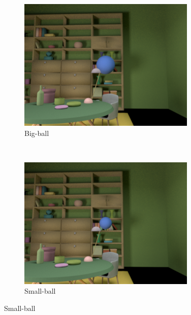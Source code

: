 \documentclass{jov}
\begin{document}
\begin{figure}[h]
\centering
\begin{subfigure}[b]{0.22 \textwidth}
        \includegraphics[width=\textwidth]{Figure12/libraryWithBigBall.png}
        \caption{Big-ball}
        \label{fig:libraryWithBigBall}
    \end{subfigure}
    ~ %
\begin{subfigure}[b]{0.22 \textwidth}
        \includegraphics[width=\textwidth]{Figure12/libraryWithSmallBall.png}
        \caption{Small-ball}
        \label{fig:libraryWithSmallBall}
    \end{subfigure}

\end{figure}
\end{document}
